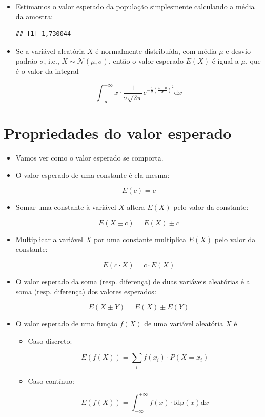 \documentclass[
  11pt]{report}
\newenvironment{Shaded}{\begin{snugshade}}{\end{snugshade}}
\newcommand{\FunctionTok}[1]{\textcolor[rgb]{0.00,0.00,0.00}{#1}}
\newcommand{\NormalTok}[1]{#1}
\newcommand{\SpecialCharTok}[1]{\textcolor[rgb]{0.00,0.00,0.00}{#1}}
\renewenvironment{Shaded}{
    \begin{mdframed}[%
      roundcorner=2pt,%
      innerleftmargin=5pt,%
      innerrightmargin=5pt,%
      topline=true,%
      leftline=true,%
      rightline=true,%
      bottomline=true,%
      linewidth=0.5pt,%
      linecolor=black!20,%
      backgroundcolor=black!2,%
      skipabove=2ex,%
      skipbelow=2.5ex%
    ]%
  }
  {
    \end{mdframed}
  }
\begin{document}
\begin{itemize}
\item
  Estimamos o valor esperado da população simplesmente calculando a média da amostra:

\begin{Shaded}
\end{Shaded}

\begin{verbatim}
## [1] 1,730044
\end{verbatim}
\item
  Se a variável aleatória $X$ é normalmente distribuída, com média $\mu$ e desvio-padrão $\sigma$, i.e., $X \sim \mathcal{N}(\mu, \sigma)$, então o valor esperado $E(X)$ é igual a $\mu$, que é o valor da integral

  \[
  \int_{-\infty}^{+\infty} x \cdot{\frac {1}{\sigma {\sqrt {2\pi }}}}e^{-{\frac {1}{2}}\left({\frac {x-\mu }{\sigma }}\right)^{2}} \text{d}x
  \]
\end{itemize}

\hypertarget{propriedades-do-valor-esperado}{%
\section{Propriedades do valor esperado}\label{propriedades-do-valor-esperado}}

\begin{itemize}
\item
  Vamos ver como o valor esperado se comporta.
\item
  O valor esperado de uma constante é ela mesma:

  \[
  E(c) = c
  \]
\item
  Somar uma constante à variável $X$ altera $E(X)$ pelo valor da constante:

  \[
  E(X \pm c) = E(X) \pm c
  \]
\item
  Multiplicar a variável $X$ por uma constante multiplica $E(X)$ pelo valor da constante:

  \[
  E(c \cdot X) = c \cdot E(X)
  \]
\item
  O valor esperado da soma (resp. diferença) de duas variáveis aleatórias é a soma (resp. diferença) dos valores esperados:

  \[
  E(X \pm Y) = E(X) \pm E(Y)
  \]
\item
  O valor esperado de uma função $f(X)$ de uma variável aleatória $X$ é

  \begin{itemize}
  \item
    Caso discreto:

    \[
    E(f(X)) = \sum_i f(x_i) \cdot P(X = x_i)
    \]
  \item
    Caso contínuo:

    \[
    E(f(X)) = \int_{-\infty}^{+\infty} f(x) \cdot \text{fdp}(x) \text{d}x
    \]
  \end{itemize}
\end{itemize}
\end{document}
